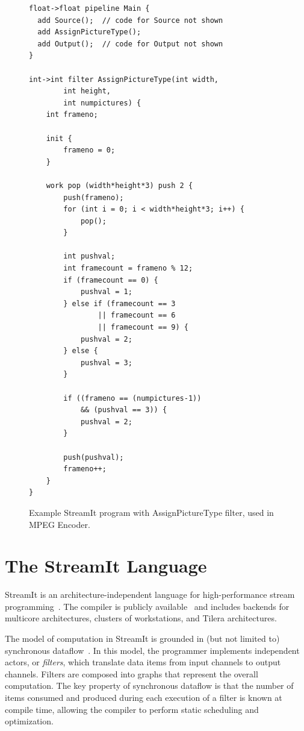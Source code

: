 \begin{figure}[t]
\eightpoint
\begin{verbatim}
float->float pipeline Main {
  add Source();  // code for Source not shown
  add AssignPictureType();
  add Output();  // code for Output not shown
}

int->int filter AssignPictureType(int width, 
        int height, 
        int numpictures) {
    int frameno;

    init {
        frameno = 0;
    }

    work pop (width*height*3) push 2 {
        push(frameno);
        for (int i = 0; i < width*height*3; i++) {
            pop();
        }

        int pushval;
        int framecount = frameno % 12;
        if (framecount == 0) {
            pushval = 1;
        } else if (framecount == 3 
                || framecount == 6 
                || framecount == 9) {
            pushval = 2;
        } else {
            pushval = 3;
        }

        if ((frameno == (numpictures-1)) 
            && (pushval == 3)) {
            pushval = 2;
        }

        push(pushval);
        frameno++;
    }
}

\end{verbatim}

\caption{Example StreamIt program with AssignPictureType filter, used in MPEG Encoder.\protect\label{fig:apt-pipeline}}
\end{figure}

\section{The StreamIt Language}
\label{sec:streamit}

StreamIt is an architecture-independent language for high-performance
stream programming~\cite{thies-cc02}.  The compiler is publicly
available~\cite{streamitweb} and includes backends for multicore
architectures, clusters of workstations, and Tilera architectures.

The model of computation in StreamIt is grounded in (but not limited
to) synchronous dataflow~\cite{lee87}.  In this model, the programmer
implements independent actors, or {\it filters}, which translate data
items from input channels to output channels.  Filters are composed
into graphs that represent the overall computation.  The key property
of synchronous dataflow is that the number of items consumed and
produced during each execution of a filter is known at compile time,
allowing the compiler to perform static scheduling and optimization.

